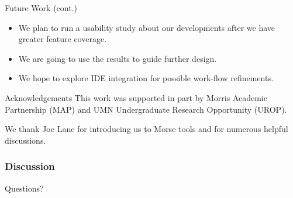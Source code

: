 \documentclass{beamer}
\begin{document}
\begin{frame}{Future Work (cont.)}
  \begin{itemize}
    \item<1-> We plan to run a usability study about our developments after we have greater feature coverage.
    \item<2-> We are going to use the results to guide further design.
    \item<3-> We hope to explore IDE integration for possible work-flow refinements.
  \end{itemize}
\end{frame}

\begin{frame}{Acknowledgements}
This work was supported in part by Morris Academic Partnership (MAP) and UMN Undergraduate Research Opportunity (UROP).  \\ 

\vspace*{0.2in}

We thank Joe Lane for introducing us to Morse tools and for numerous helpful discussions.
\end{frame}

\begin{frame}
  \frametitle{Discussion}
Questions?
\end{frame}
\end{document}
